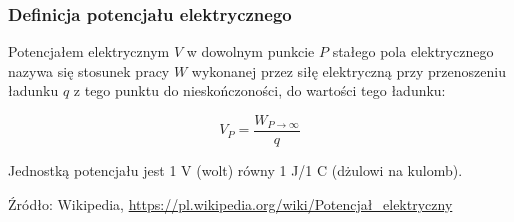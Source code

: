 \documentclass[12pt,aspectratio=169]{beamer}
\begin{document}
\begin{frame}[fragile]

\frametitle{Definicja potencjału elektrycznego}

Potencjałem elektrycznym $V$ w dowolnym punkcie $P$ stałego pola elektrycznego nazywa się stosunek pracy $W$ wykonanej przez siłę elektryczną przy przenoszeniu ładunku $q$ z tego punktu do nieskończoności, do wartości tego ładunku:

$$V_{P}={\frac {W_{P\to \infty }}{q}}$$

Jednostką potencjału jest 1 V (wolt) równy 1 J/1 C (dżulowi na kulomb).


\vspace{2cm}\begin{flushright}
\footnotesize Źródło: Wikipedia, \url{https://pl.wikipedia.org/wiki/Potencjał_elektryczny}
\end{flushright}

\end{frame}
\end{document}
